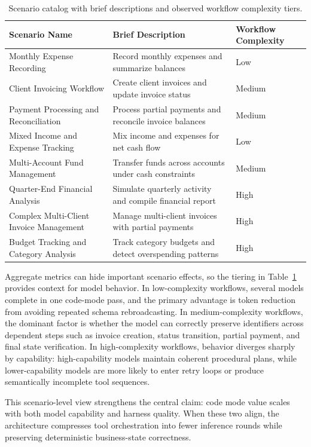 \documentclass[journal,article,submit,pdftex,moreauthors]{Definitions/mdpi}
\begin{document}
\begin{table}[H]
\caption{Scenario catalog with brief descriptions and observed workflow complexity tiers.\label{tab:scenario_complexity}}
\begin{tabularx}{\textwidth}{>{\RaggedRight\arraybackslash}X>{\RaggedRight\arraybackslash}X>{\RaggedRight\arraybackslash}X}
\toprule
\textbf{Scenario Name} & \textbf{Brief Description} & \textbf{Workflow Complexity}\\
\midrule
Monthly Expense Recording & Record monthly expenses and summarize balances & Low\\
Client Invoicing Workflow & Create client invoices and update invoice status & Medium\\
Payment Processing and Reconciliation & Process partial payments and reconcile invoice balances & Medium\\
Mixed Income and Expense Tracking & Mix income and expenses for net cash flow & Low\\
Multi-Account Fund Management & Transfer funds across accounts under cash constraints & Medium\\
Quarter-End Financial Analysis & Simulate quarterly activity and compile financial report & High\\
Complex Multi-Client Invoice Management & Manage multi-client invoices with partial payments & High\\
Budget Tracking and Category Analysis & Track category budgets and detect overspending patterns & High\\
\bottomrule
\end{tabularx}
\end{table}

Aggregate metrics can hide important scenario effects, so the tiering in Table~\ref{tab:scenario_complexity} provides context for model behavior. In low-complexity workflows, several models complete in one code-mode pass, and the primary advantage is token reduction from avoiding repeated schema rebroadcasting. In medium-complexity workflows, the dominant factor is whether the model can correctly preserve identifiers across dependent steps such as invoice creation, status transition, partial payment, and final state verification. In high-complexity workflows, behavior diverges sharply by capability: high-capability models maintain coherent procedural plans, while lower-capability models are more likely to enter retry loops or produce semantically incomplete tool sequences.

This scenario-level view strengthens the central claim: code mode value scales with both model capability and harness quality. When these two align, the architecture compresses tool orchestration into fewer inference rounds while preserving deterministic business-state correctness.
\end{document}
